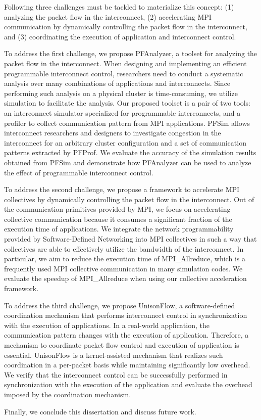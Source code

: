 Following three challenges must be tackled to materialize this concept: (1)
analyzing the packet flow in the interconnect, (2) accelerating MPI
communication by dynamically controlling the packet flow in the interconnect,
and (3) coordinating the execution of application and interconnect control.

To address the first challenge, we propose PFAnalyzer, a toolset for analyzing
the packet flow in the interconnect. When designing and implementing an
efficient programmable interconnect control, researchers need to conduct a
systematic analysis over many combinations of applications and interconnects.
Since performing such analysis on a physical cluster is time-consuming, we
utilize simulation to facilitate the analysis. Our proposed toolset is a pair
of two tools: an interconnect simulator specialized for programmable
interconnects, and a profiler to collect communication pattern from MPI
applications. PFSim allows interconnect researchers and designers to
investigate congestion in the interconnect for an arbitrary cluster
configuration and a set of communication patterns extracted by PFProf. We
evaluate the accuracy of the simulation results obtained from PFSim and
demonstrate how PFAnalyzer can be used to analyze the effect of programmable
interconnect control.

To address the second challenge, we propose a framework to accelerate MPI
collectives by dynamically controlling the packet flow in the interconnect.
Out of the communication primitives provided by MPI, we focus on accelerating
collective communication because it consumes a significant fraction of the
execution time of applications. We integrate the network programmability
provided by Software-Defined Networking into MPI collectives in such a way
that collectives are able to effectively utilize the bandwidth of the
interconnect. In particular, we aim to reduce the execution time of
MPI\_Allreduce, which is a frequently used MPI collective communication in
many simulation codes. We evaluate the speedup of MPI\_Allreduce when using
our collective acceleration framework.

To address the third challenge, we propose UnisonFlow, a software-defined
coordination mechanism that performs interconnect control in synchronization
with the execution of applications. In a real-world application, the
communication pattern changes with the execution of application. Therefore, a
mechanism to coordinate packet flow control and execution of application is
essential. UnisonFlow is a kernel-assisted mechanism that realizes such
coordination in a per-packet basis while maintaining significantly low
overhead. We verify that the interconnect control can be successfully
performed in synchronization with the execution of the application and
evaluate the overhead imposed by the coordination mechanism.

Finally, we conclude this dissertation and discuss future work.
